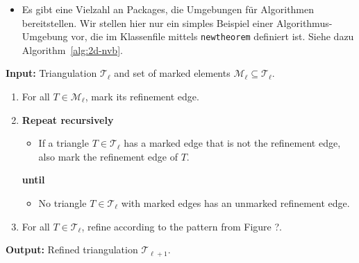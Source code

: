 \begin{itemize}
  \item Es gibt eine Vielzahl an Packages, die Umgebungen für Algorithmen bereitstellen.
  Wir stellen hier nur ein simples Beispiel einer Algorithmus-Umgebung vor, die im Klassenfile mittels \verb$newtheorem$ definiert ist.
  Siehe dazu Algorithm~\ref{alg:2d-nvb}.
\end{itemize}

\pagebreak

\begin{algorithm}\label{alg:2d-nvb}
  \textbf{Input:} Triangulation $\mathcal{T}_\ell$ and set of marked elements $\mathcal{M}_\ell \subseteq \mathcal{T}_\ell$.
  \begin{enumerate}[topsep=0pt,itemsep=-1ex,partopsep=1ex,parsep=1ex]
    \item For all $T \in \mathcal{M}_\ell$, mark its refinement edge.
    \item \textbf{Repeat recursively}\label{alg-step:nvb-closure}
      \begin{itemize}[label={},leftmargin=*,labelindent=1ex,topsep=-1ex,itemsep=-1ex,partopsep=1ex,parsep=1ex]
        \item If a triangle $T \in \mathcal{T}_\ell$ has a marked edge that is not the refinement edge, also mark the refinement edge of $T$.
      \end{itemize}
      \textbf{until}
      \begin{itemize}[label={},leftmargin=*,labelindent=1ex,topsep=-1ex,itemsep=-1ex,partopsep=1ex,parsep=1ex]
        \item No triangle $T \in \mathcal{T}_\ell$ with marked edges has an unmarked refinement edge.
      \end{itemize}
    \item For all $T \in \mathcal{T}_\ell$, refine according to the pattern from Figure ?.
  \end{enumerate}
  \textbf{Output:} Refined triangulation $\mathcal{T}_{\ell+1}$.
\end{algorithm}

